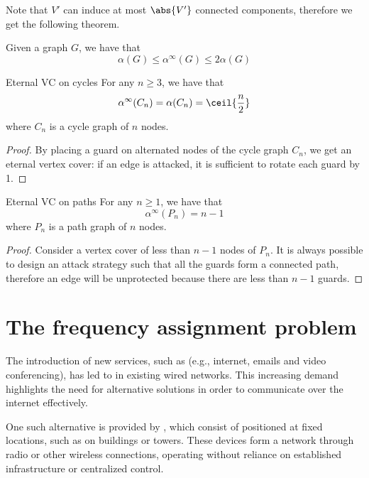 \documentclass[a4paper, 12pt]{report}
\begin{document}
    Note that $V'$ can induce at most $\abs{V'}$ connected components, therefore we get the following theorem.

    \begin{framedthm}{}
        Given a graph $G$, we have that $$\alpha(G) \le \alpha^{\infty} (G) \le 2 \alpha(G)$$
    \end{framedthm}

    \begin{framedthm}{Eternal VC on cycles}
        For any $n \ge 3$, we have that $$\alpha^{\infty}(C_n) = \alpha(C_n) = \ceil{\frac{n}{2}}$$ where $C_n$ is a cycle graph of $n$ nodes.
    \end{framedthm}

    \begin{proof}
        By placing a guard on alternated nodes of the cycle graph $C_n$, we get an eternal vertex cover: if an edge is attacked, it is sufficient to rotate each guard by 1.
    \end{proof}

    \begin{framedthm}{Eternal VC on paths}
        For any $n \ge 1$, we have that $$\alpha^{\infty}(P_n) = n - 1$$ where $P_n$ is a path graph of $n$ nodes.
    \end{framedthm}
    
    \begin{proof}
        Consider a vertex cover of less than $n - 1$ nodes of $P_n$. It is always possible to design an attack strategy such that all the guards form a connected path, therefore an edge will be unprotected because there are less than $n - 1$ guards.
    \end{proof}

    \chapter{The frequency assignment problem}

    The introduction of new services, such as  (e.g., internet, emails and video conferencing), has led to  in existing wired networks. This increasing demand highlights the need for alternative solutions in order to communicate over the internet effectively.

    One such alternative is provided by , which consist of  positioned at fixed locations, such as on buildings or towers. These devices form a network through radio or other wireless connections, operating without reliance on established infrastructure or centralized control.
\end{document}
